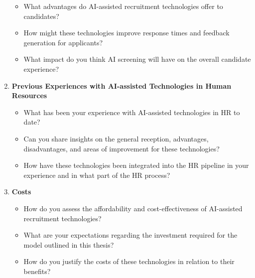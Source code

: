 \documentclass[draft,final]{thesisclass} %
\begin{document}
\begin{enumerate}
\begin{itemize}
        \item What advantages do \acs{AI}-assisted recruitment technologies offer to candidates?
        \item How might these technologies improve response times and feedback generation for applicants?
        \item What impact do you think \acs{AI} screening will have on the overall candidate experience?
    \end{itemize}
    \item \textbf{Previous Experiences with \acs{AI}-assisted Technologies in Human Resources}
    \begin{itemize}
        \item What has been your experience with \acs{AI}-assisted technologies in \acs{HR} to date?
        \item Can you share insights on the general reception, advantages, disadvantages, and areas of improvement for these technologies?
        \item How have these technologies been integrated into the \acs{HR} pipeline in your experience and in what part of the \acs{HR} process?
    \end{itemize}
    \item \textbf{Costs}
    \begin{itemize}
        \item How do you assess the affordability and cost-effectiveness of \acs{AI}-assisted recruitment technologies?
        \item What are your expectations regarding the investment required for the model outlined in this thesis?
        \item How do you justify the costs of these technologies in relation to their benefits?
    \end{itemize}
\end{enumerate}
\end{document}
